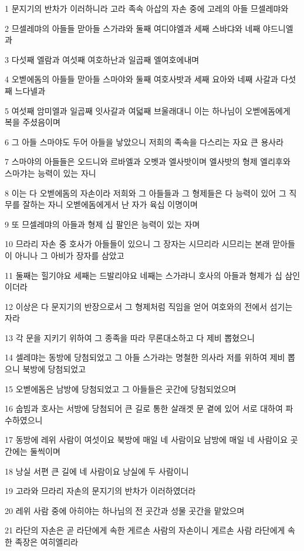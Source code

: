 \par 1 문지기의 반차가 이러하니라 고라 족속 아삽의 자손 중에 고레의 아들 므셀레먀와
\par 2 므셀레먀의 아들들 맏아들 스가랴와 둘째 여디야엘과 세째 스바댜와 네째 야드니엘과
\par 3 다섯째 엘람과 여섯째 여호하난과 일곱째 엘여호에내며
\par 4 오벧에돔의 아들들 맏아들 스마야와 둘째 여호사밧과 세째 요아와 네째 사갈과 다섯째 느다넬과
\par 5 여섯째 암미엘과 일곱째 잇사갈과 여덟째 브울래대니 이는 하나님이 오벧에돔에게 복을 주셨음이며
\par 6 그 아들 스마야도 두어 아들을 낳았으니 저희의 족속을 다스리는 자요 큰 용사라
\par 7 스마야의 아들들은 오드니와 르바엘과 오벳과 엘사밧이며 엘사밧의 형제 엘리후와 스마갸는 능력이 있는 자니
\par 8 이는 다 오벧에돔의 자손이라 저희와 그 아들들과 그 형제들은 다 능력이 있어 그 직무를 잘하는 자니 오벧에돔에게서 난 자가 육십 이명이며
\par 9 또 므셀레먀의 아들과 형제 십 팔인은 능력이 있는 자며
\par 10 므라리 자손 중 호사가 아들들이 있으니 그 장자는 시므리라 시므리는 본래 맏아들이 아니나 그 아비가 장자를 삼았고
\par 11 둘째는 힐기야요 세째는 드발리야요 네째는 스가랴니 호사의 아들과 형제가 십 삼인이더라
\par 12 이상은 다 문지기의 반장으로서 그 형제처럼 직임을 얻어 여호와의 전에서 섬기는 자라
\par 13 각 문을 지키기 위하여 그 종족을 따라 무론대소하고 다 제비 뽑혔으니
\par 14 셀레먀는 동방에 당첨되었고 그 아들 스가랴는 명철한 의사라 저를 위하여 제비 뽑으니 북방에 당첨되었고
\par 15 오벧에돔은 남방에 당첨되었고 그 아들들은 곳간에 당첨되었으며
\par 16 숩빔과 호사는 서방에 당첨되어 큰 길로 통한 살래겟 문 곁에 있어 서로 대하여 파수하였으니
\par 17 동방에 레위 사람이 여섯이요 북방에 매일 네 사람이요 남방에 매일 네 사람이요 곳간에는 둘씩이며
\par 18 낭실 서편 큰 길에 네 사람이요 낭실에 두 사람이니
\par 19 고라와 므라리 자손의 문지기의 반차가 이러하였더라
\par 20 레위 사람 중에 아히야는 하나님의 전 곳간과 성물 곳간을 맡았으며
\par 21 라단의 자손은 곧 라단에게 속한 게르손 사람의 자손이니 게르손 사람 라단에게 속한 족장은 여히엘리라
